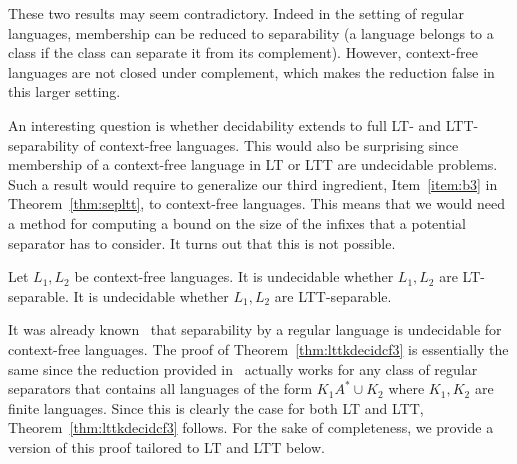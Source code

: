 \documentclass{LMCS}
\newcommand{\lt}{\textup{LT}\xspace}
\newcommand{\ltt}{\textup{LTT}\xspace}
\theoremstyle{plain}
\begin{document}
These two results may seem contradictory. Indeed in the setting of
regular languages, membership can be reduced to separability (a
language belongs to a class if the class can separate it from its
complement). However, context-free languages are not closed under
complement, which makes the reduction false in this larger setting.

An interesting question is whether decidability extends to full \lt-
and \ltt-separability of context-free languages. This would also be
surprising since membership of a context-free language in \lt or \ltt
are undecidable problems. Such a result would require to
generalize our third ingredient,  Item~\eqref{item:b3} in
Theorem~\ref{thm:sepltt}, to context-free languages. This means that
we would need a method for computing a bound on the size of the
infixes that a potential separator has to consider. It turns out that
this is not possible. 

\begin{thm} \label{thm:lttkdecidcf3}
  Let $L_1,L_2$ be context-free languages. It is undecidable 
  whether $L_1,L_2$ are \lt-separable. It is undecidable 
  whether
  $L_1,L_2$ are \ltt-separable.
\end{thm}

It was already known~\cite{szygram} that separability by a regular
language is undecidable for context-free languages. The proof of
Theorem~\ref{thm:lttkdecidcf3} is essentially the same since the
reduction provided in~\cite{szygram} actually works for any class of
regular separators that contains all languages of the form $K_1A^{*}\cup
K_2$ where $K_1,K_2$ are finite languages. Since this is
clearly the case for both \lt and \ltt, Theorem~\ref{thm:lttkdecidcf3}
follows. For the sake of completeness, we provide a version of this proof
tailored to \lt and \ltt below.
\end{document}
